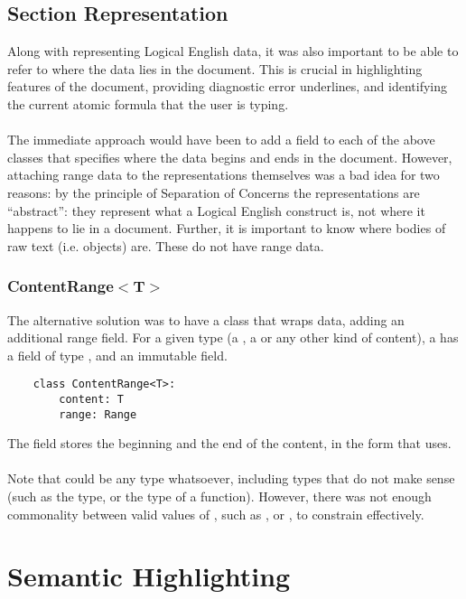 \documentclass[../main.tex]{subfiles}
\begin{document}
\subsection{Section Representation}
Along with representing Logical English data, it was also important to be able to refer to where the data lies in the document. This is crucial in highlighting features of the document, providing diagnostic error underlines, and identifying the current atomic formula that the user is typing. 
\\
\\
The immediate approach would have been to add a  field to each of the above classes that specifies where the data begins and ends in the document. However, attaching range data to the representations themselves was a bad idea for two reasons: by the principle of Separation of Concerns  the representations are ``abstract'': they represent what a Logical English construct is, not where it happens to lie in a document. Further, it is important to know where bodies of raw text (i.e.  objects) are. These do not have range data.

\subsubsection{ContentRange$<$T$>$}
The alternative solution was to have a class that wraps data, adding an additional range field. For a given type  (a , a  or any other kind of content), a  has a  field of type , and an immutable  field. 
\begin{lstlisting}
    class ContentRange<T>:
        content: T
        range: Range
\end{lstlisting}
The  field stores the beginning and the end of the content, in the  form that  uses. 
\\
\\
Note that  could be any type whatsoever, including types that do not make sense (such as the  type, or the type of a function). However, there was not enough commonality between valid values of , such as ,  or , to constrain  effectively.
%
%
%
\section{Semantic Highlighting}
\end{document}
